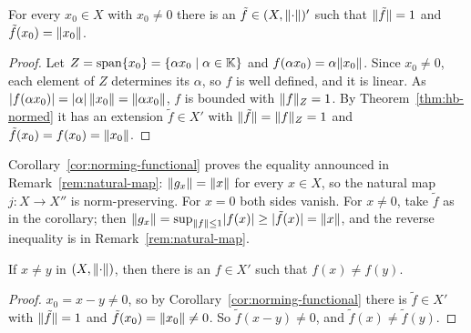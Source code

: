 \begin{corollary}\label{cor:norming-functional}
For every $x_0 \in X$ with $x_0 \ne 0$ there is an
$\tilde{f} \in (X, \lVert\cdot\rVert)'$ such that $\lVert\tilde{f}\rVert = 1$ and
$\tilde{f}(x_0) = \lVert x_0\rVert$.
\end{corollary}

\begin{proof}
Let $Z = \operatorname{span}\{x_0\} = \{\alpha x_0 \mid \alpha \in \mathbb{K}\}$
and $f(\alpha x_0) = \alpha \lVert x_0\rVert$. Since $x_0 \ne 0$, each element of
$Z$ determines its $\alpha$, so $f$ is well defined, and it is linear. As
$\lvert f(\alpha x_0)\rvert = \lvert\alpha\rvert\,\lVert x_0\rVert = \lVert\alpha x_0\rVert$,
$f$ is bounded with $\lVert f\rVert_Z = 1$. By Theorem~\ref{thm:hb-normed} it has
an extension $\tilde{f} \in X'$ with $\lVert\tilde{f}\rVert = \lVert f\rVert_Z = 1$
and $\tilde{f}(x_0) = f(x_0) = \lVert x_0\rVert$.
\end{proof}

\begin{remark}\label{rem:j-isometric}
Corollary~\ref{cor:norming-functional} proves the equality announced in
Remark~\ref{rem:natural-map}: $\lVert g_x\rVert = \lVert x\rVert$ for every $x \in X$, so
the natural map $j \colon X \to X''$ is norm-preserving. For $x = 0$ both
sides vanish. For $x \ne 0$, take $\tilde{f}$ as in the corollary; then
$\lVert g_x\rVert = \sup_{\lVert f\rVert \le 1} \lvert f(x)\rvert \ge \lvert\tilde{f}(x)\rvert
= \lVert x\rVert$, and the reverse inequality is in
Remark~\ref{rem:natural-map}.
\end{remark}

\begin{corollary}\label{cor:separating}
If $x \ne y$ in $(X, \lVert\cdot\rVert)$, then there is an $f \in X'$ such that
$f(x) \ne f(y)$.
\end{corollary}

\begin{proof}
$x_0 = x - y \ne 0$, so by Corollary~\ref{cor:norming-functional} there is
$\tilde{f} \in X'$ with $\lVert\tilde{f}\rVert = 1$ and
$\tilde{f}(x_0) = \lVert x_0\rVert \ne 0$. So $\tilde{f}(x - y) \ne 0$, and
$\tilde{f}(x) \ne \tilde{f}(y)$.
\end{proof}
